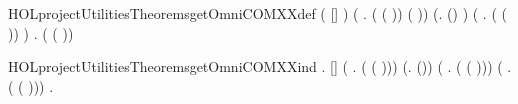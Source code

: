 \newcommand{\HOLprojectUtilitiesDate}{27 December 2018}
\newcommand{\HOLprojectUtilitiesTime}{13:06}
\begin{SaveVerbatim}{HOLprojectUtilitiesTheoremsgetOmniCOMXXdef}
\HOLTokenTurnstile{} ( [] \HOLSymConst{=} ) \HOLSymConst{\HOLTokenConj{}}
   (\HOLSymConst{\HOLTokenForall{}} .
       ( ( )\HOLSymConst{::}) \HOLSymConst{=}
       ( )) \HOLSymConst{\HOLTokenConj{}}
   (\HOLSymConst{\HOLTokenForall{}}.  (\HOLSymConst{::}) \HOLSymConst{=}  ) \HOLSymConst{\HOLTokenConj{}}
   (\HOLSymConst{\HOLTokenForall{}} .
       ( ( )\HOLSymConst{::}) \HOLSymConst{=}
       ) \HOLSymConst{\HOLTokenConj{}}
   \HOLSymConst{\HOLTokenForall{}} .
      ( ( )\HOLSymConst{::}) \HOLSymConst{=}
      
\end{SaveVerbatim}
\newcommand{\HOLprojectUtilitiesTheoremsgetOmniCOMXXdef}{\UseVerbatim{HOLprojectUtilitiesTheoremsgetOmniCOMXXdef}}
\begin{SaveVerbatim}{HOLprojectUtilitiesTheoremsgetOmniCOMXXind}
\HOLTokenTurnstile{} \HOLSymConst{\HOLTokenForall{}}.
      [] \HOLSymConst{\HOLTokenConj{}} (\HOLSymConst{\HOLTokenForall{}} .  ( ( )\HOLSymConst{::})) \HOLSymConst{\HOLTokenConj{}}
     (\HOLSymConst{\HOLTokenForall{}}.   \HOLSymConst{\HOLTokenImp{}}  (\HOLSymConst{::})) \HOLSymConst{\HOLTokenConj{}}
     (\HOLSymConst{\HOLTokenForall{}} .   \HOLSymConst{\HOLTokenImp{}}  ( ( )\HOLSymConst{::})) \HOLSymConst{\HOLTokenConj{}}
     (\HOLSymConst{\HOLTokenForall{}} .   \HOLSymConst{\HOLTokenImp{}}  ( ( )\HOLSymConst{::})) \HOLSymConst{\HOLTokenImp{}}
     \HOLSymConst{\HOLTokenForall{}}.  
\end{SaveVerbatim}

